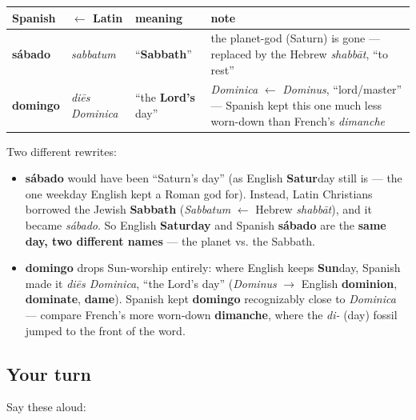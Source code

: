 \begin{cousinweb}
\noindent
\begin{tabularx}{\linewidth}{@{}>{\raggedright\arraybackslash}X>{\raggedright\arraybackslash}X>{\raggedright\arraybackslash}X>{\raggedright\arraybackslash}X@{}}
\toprule
\textbf{Spanish} & \textbf{$\leftarrow$ Latin} & \textbf{meaning} & \textbf{note} \\
\midrule
\textbf{sábado} & \emph{sabbatum} & \textquotedblleft{}\textbf{Sabbath}\textquotedblright{} & the planet-god (Saturn) is gone — replaced by the Hebrew \emph{shabbāt}, \textquotedblleft{}to rest\textquotedblright{} \\
\textbf{domingo} & \emph{diēs Dominica} & \textquotedblleft{}the \textbf{Lord's} day\textquotedblright{} & \emph{Dominica} $\leftarrow$ \emph{Dominus}, \textquotedblleft{}lord/master\textquotedblright{} — Spanish kept this one much less worn-down than French's \emph{dimanche} \\
\bottomrule
\end{tabularx}

Two different rewrites:

\begin{itemize}
\raggedright
  \item \textbf{sábado} would have been \textquotedblleft{}Saturn's day\textquotedblright{} (as English \textbf{Satur}day still is — the one weekday English kept a Roman god for). Instead, Latin Christians borrowed the Jewish \textbf{Sabbath} (\emph{Sabbatum} $\leftarrow$ Hebrew \emph{shabbāt}), and it became \emph{sábado}. So English \textbf{Saturday} and Spanish \textbf{sábado} are the \textbf{same day, two different names} — the planet vs. the Sabbath.
  \item \textbf{domingo} drops Sun-worship entirely: where English keeps \textbf{Sun}day, Spanish made it \emph{diēs Dominica}, \textquotedblleft{}the Lord's day\textquotedblright{} (\emph{Dominus} $\to$ English \textbf{dominion}, \textbf{dominate}, \textbf{dame}). Spanish kept \textbf{domingo} recognizably close to \emph{Dominica} — compare French's more worn-down \textbf{dimanche}, where the \emph{di-} (day) fossil jumped to the front of the word.
\end{itemize}
\end{cousinweb}

\subsection*{Your turn}
Say these aloud:

